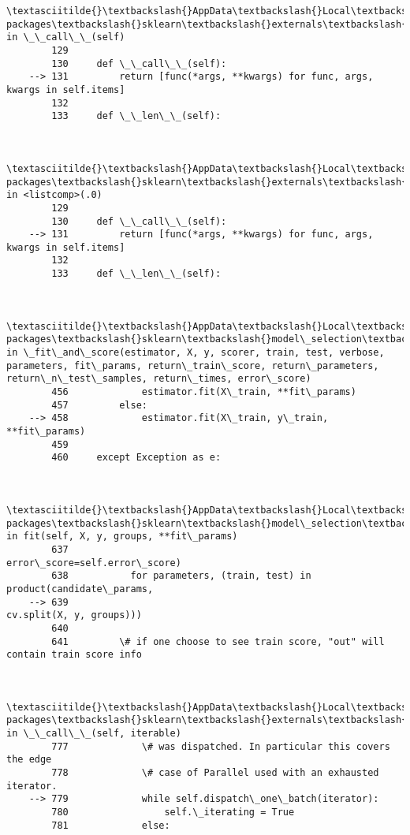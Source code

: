 \documentclass[11pt]{article}
\begin{document}
\begin{Verbatim}[commandchars=\\\{\}]
        \textasciitilde{}\textbackslash{}AppData\textbackslash{}Local\textbackslash{}Continuum\textbackslash{}anaconda3\textbackslash{}lib\textbackslash{}site-packages\textbackslash{}sklearn\textbackslash{}externals\textbackslash{}joblib\textbackslash{}parallel.py in \_\_call\_\_(self)
        129 
        130     def \_\_call\_\_(self):
    --> 131         return [func(*args, **kwargs) for func, args, kwargs in self.items]
        132 
        133     def \_\_len\_\_(self):
    

        \textasciitilde{}\textbackslash{}AppData\textbackslash{}Local\textbackslash{}Continuum\textbackslash{}anaconda3\textbackslash{}lib\textbackslash{}site-packages\textbackslash{}sklearn\textbackslash{}externals\textbackslash{}joblib\textbackslash{}parallel.py in <listcomp>(.0)
        129 
        130     def \_\_call\_\_(self):
    --> 131         return [func(*args, **kwargs) for func, args, kwargs in self.items]
        132 
        133     def \_\_len\_\_(self):
    

        \textasciitilde{}\textbackslash{}AppData\textbackslash{}Local\textbackslash{}Continuum\textbackslash{}anaconda3\textbackslash{}lib\textbackslash{}site-packages\textbackslash{}sklearn\textbackslash{}model\_selection\textbackslash{}\_validation.py in \_fit\_and\_score(estimator, X, y, scorer, train, test, verbose, parameters, fit\_params, return\_train\_score, return\_parameters, return\_n\_test\_samples, return\_times, error\_score)
        456             estimator.fit(X\_train, **fit\_params)
        457         else:
    --> 458             estimator.fit(X\_train, y\_train, **fit\_params)
        459 
        460     except Exception as e:
    

        \textasciitilde{}\textbackslash{}AppData\textbackslash{}Local\textbackslash{}Continuum\textbackslash{}anaconda3\textbackslash{}lib\textbackslash{}site-packages\textbackslash{}sklearn\textbackslash{}model\_selection\textbackslash{}\_search.py in fit(self, X, y, groups, **fit\_params)
        637                                   error\_score=self.error\_score)
        638           for parameters, (train, test) in product(candidate\_params,
    --> 639                                                    cv.split(X, y, groups)))
        640 
        641         \# if one choose to see train score, "out" will contain train score info
    

        \textasciitilde{}\textbackslash{}AppData\textbackslash{}Local\textbackslash{}Continuum\textbackslash{}anaconda3\textbackslash{}lib\textbackslash{}site-packages\textbackslash{}sklearn\textbackslash{}externals\textbackslash{}joblib\textbackslash{}parallel.py in \_\_call\_\_(self, iterable)
        777             \# was dispatched. In particular this covers the edge
        778             \# case of Parallel used with an exhausted iterator.
    --> 779             while self.dispatch\_one\_batch(iterator):
        780                 self.\_iterating = True
        781             else:
    


\end{Verbatim}
\end{document}
